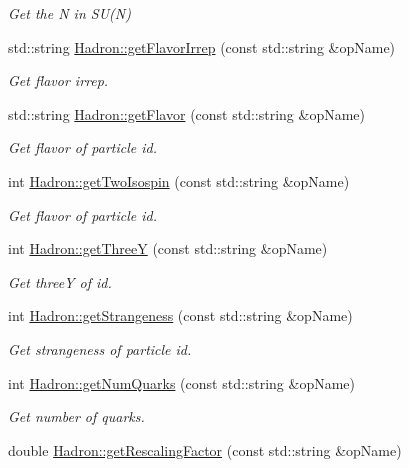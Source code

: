 \begin{DoxyCompactItemize}
\begin{DoxyCompactList}\small\item\em Get the N in S\+U(\+N) \end{DoxyCompactList}\item 
std\+::string \mbox{\hyperlink{namespaceHadron_ad5a318554ed24d3e28841abd57345adf}{Hadron\+::get\+Flavor\+Irrep}} (const std\+::string \&op\+Name)
\begin{DoxyCompactList}\small\item\em Get flavor irrep. \end{DoxyCompactList}\item 
std\+::string \mbox{\hyperlink{namespaceHadron_adfbec5b7f783df2c9cefec3692adf179}{Hadron\+::get\+Flavor}} (const std\+::string \&op\+Name)
\begin{DoxyCompactList}\small\item\em Get flavor of particle id. \end{DoxyCompactList}\item 
int \mbox{\hyperlink{namespaceHadron_a28f936e0038f56334a16574038c9aa0b}{Hadron\+::get\+Two\+Isospin}} (const std\+::string \&op\+Name)
\begin{DoxyCompactList}\small\item\em Get flavor of particle id. \end{DoxyCompactList}\item 
int \mbox{\hyperlink{namespaceHadron_a8739169b4caffa5f8bab802592b3302a}{Hadron\+::get\+ThreeY}} (const std\+::string \&op\+Name)
\begin{DoxyCompactList}\small\item\em Get threeY of id. \end{DoxyCompactList}\item 
int \mbox{\hyperlink{namespaceHadron_adfdd6762b0b73d56c308a674d4c0164d}{Hadron\+::get\+Strangeness}} (const std\+::string \&op\+Name)
\begin{DoxyCompactList}\small\item\em Get strangeness of particle id. \end{DoxyCompactList}\item 
int \mbox{\hyperlink{namespaceHadron_a030f1f2fabdb2b0de5421b2a0a15689c}{Hadron\+::get\+Num\+Quarks}} (const std\+::string \&op\+Name)
\begin{DoxyCompactList}\small\item\em Get number of quarks. \end{DoxyCompactList}\item 
double \mbox{\hyperlink{namespaceHadron_abc76a2d893a589ba2a1a346954901854}{Hadron\+::get\+Rescaling\+Factor}} (const std\+::string \&op\+Name)

\end{DoxyCompactItemize}
